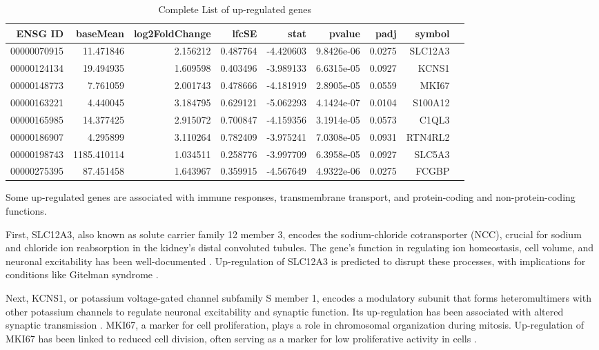 \documentclass{article}
\begin{document}
\begin{table}[H]
    \centering
    \begin{tabular}{rrrrrrrrl}
    \toprule
    ENSG ID & baseMean & log2FoldChange & lfcSE & stat & pvalue & padj & symbol \\
    \midrule
    00000070915 & 11.471846 & 2.156212 & 0.487764 & -4.420603 & 9.8426e-06 & 0.0275 & SLC12A3 \\
    00000124134 & 19.494935 & 1.609598 & 0.403496 & -3.989133 & 6.6315e-05 & 0.0927 & KCNS1 \\
    00000148773 & 7.761059 & 2.001743 & 0.478666 & -4.181919 & 2.8905e-05 & 0.0559 & MKI67 \\
    00000163221 & 4.440045 & 3.184795 & 0.629121 & -5.062293 & 4.1424e-07 & 0.0104 & S100A12 \\
    00000165985 & 14.377425 & 2.915072 & 0.700847 & -4.159356 & 3.1914e-05 & 0.0573 & C1QL3 \\
    00000186907 & 4.295899 & 3.110264 & 0.782409 & -3.975241 & 7.0308e-05 & 0.0931 & RTN4RL2 \\
    00000198743 & 1185.410114 & 1.034511 & 0.258776 & -3.997709 & 6.3958e-05 & 0.0927 & SLC5A3 \\
    00000275395 & 87.451458 & 1.643967 & 0.359915 & -4.567649 & 4.9322e-06 & 0.0275 & FCGBP \\
    \bottomrule
    \end{tabular}
    \caption{Complete List of up-regulated genes}
    \label{table:down_regulated}
\end{table}
Some up-regulated genes are associated with immune responses, transmembrane transport, and protein-coding and non-protein-coding functions.

First, SLC12A3, also known as solute carrier family 12 member 3, encodes the sodium-chloride cotransporter (NCC), crucial for sodium and chloride ion reabsorption in the kidney's distal convoluted tubules. The gene’s function in regulating ion homeostasis, cell volume, and neuronal excitability has been well-documented \cite{Zhang2023Role, Li2022Gitelman, Trejo2023CryoEM}. Up-regulation of SLC12A3 is predicted to disrupt these processes, with implications for conditions like Gitelman syndrome \cite{Li2022Gitelman}.

Next, KCNS1, or potassium voltage-gated channel subfamily S member 1, encodes a modulatory subunit that forms heteromultimers with other potassium channels to regulate neuronal excitability and synaptic function. Its up-regulation has been associated with altered synaptic transmission \cite{Koch2020Potassium}. MKI67, a marker for cell proliferation, plays a role in chromosomal organization during mitosis. Up-regulation of MKI67 has been linked to reduced cell division, often serving as a marker for low proliferative activity in cells \cite{Rahman2015Ki67}.
\end{document}
